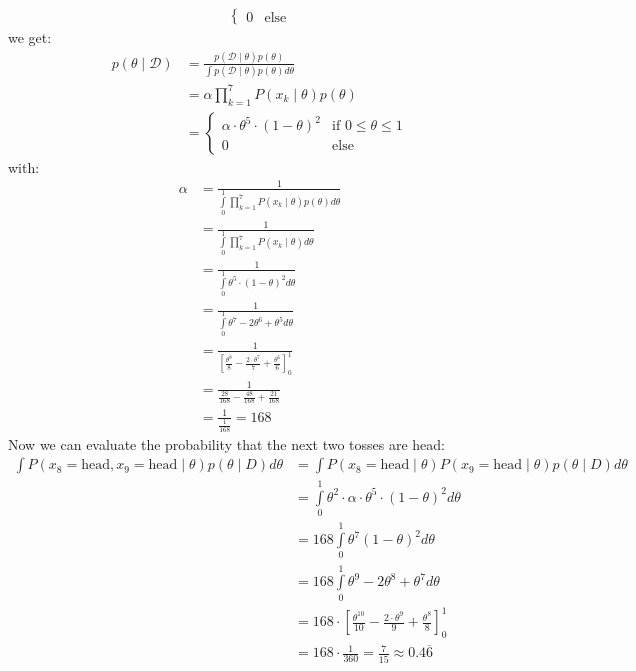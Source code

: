 \documentclass[10pt,a4paper]{article}
\newcommand{\D}{\mathcal{D}}
\begin{document}
\begin{enumerate}[(a)]
\begin{align*}
\begin{cases}
        0    & \text{else}
    \end{cases}
\end{align*}
we get:
\begin{align*}
    p(\theta \mid \D) &= \frac{p(\D \mid \theta)p(\theta)}{\int p(\D \mid \theta)p(\theta) d\theta} \\
    &= \alpha \prod_{k = 1}^{7} P(x_k \mid \theta) p(\theta)\\
    &=
    \begin{cases}
        \alpha \cdot \theta^5 \cdot (1 - \theta)^2    &\text{if } 0\le \theta \le 1\\0    & \text{else}
    \end{cases}        
\end{align*}
with:
\begin{align*}
    \alpha &= \frac{1}{\int \limits_{0}^1 \prod_{k = 1}^{7} P(x_k \mid \theta) p(\theta) d\theta}\\
    &= \frac{1}{\int \limits_{0}^1 \prod_{k = 1}^{7} P(x_k \mid \theta) d\theta}\\
    &= \frac{1}{\int \limits_{0}^1  \theta^5 \cdot (1 - \theta)^2 d\theta}\\
    &= \frac{1}{\int \limits_{0}^1 \theta^7 - 2\theta^6 + \theta^5 d\theta}\\
    &= \frac{1}{[\frac{\theta^8}{8}-\frac{2\cdot\theta^7}{7}+\frac{\theta^6}{6}]_{0}^1}\\
    &= \frac{1}{\frac{28}{168}-\frac{48}{168}+\frac{21}{168}}\\   
    &= \frac{1}{\frac{1}{168}} = 168
\end{align*}
Now we can evaluate the probability that the next two tosses are head:
\begin{align*}
\int P(x_8 = \text{head}, x_9 = \text{head} \mid \theta) p(\theta \mid D) d\theta &= \int P(x_8 = \text{head} \mid \theta) P(x_9 = \text{head} \mid \theta) p(\theta \mid D) d\theta\\
&= \int \limits_{0}^1 \theta^2 \cdot \alpha \cdot \theta^5\cdot (1-\theta)^2 d\theta\\
&= 168 \int \limits_{0}^1 \theta^7 (1-\theta)^2 d\theta\\
&= 168 \int \limits_{0}^1 \theta^9 - 2\theta^8+\theta^7 d\theta\\
&= 168 \cdot [\frac{\theta^{10}}{10}-\frac{2\cdot\theta^9}{9}+\frac{\theta^8}{8}]_{0}^1\\
&= 168 \cdot \frac{1}{360} = \frac{7}{15} \approx 0.4\overline{6}
\end{align*}

\end{enumerate}
\end{document}

